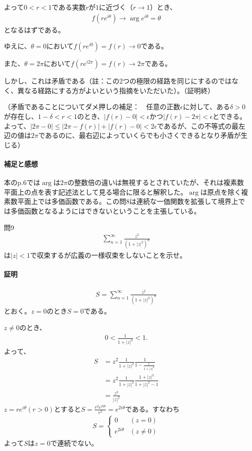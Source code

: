 よって$0<r<1$である実数$r$が$1$に近づく（$r\longrightarrow1$）とき、
\begin{align*}
    f(re^{i\theta})\longrightarrow \arg e^{i\theta}=\theta
\end{align*}
となるはずである。

ゆえに、$\theta=0$において$f(re^{i0})=f(r)\longrightarrow0$である。

また、$\theta=2\pi$において$f(re^{i2\pi})=f(r)\longrightarrow2\pi$である。

しかし、これは矛盾である（註：この2つの極限の経路を同じにするのではなく、異なる経路にする方がよいという指摘をいただいた）。（証明終）

（矛盾であることについてダメ押しの補足：　任意の正数$\epsilon$に対して、ある$\delta>0$が存在し、$1-\delta<r<1$のとき、$|f(r)-0|<\epsilon$かつ$|f(r)-2\pi|<\epsilon$とできる。
よって、$|2\pi-0|\le|2\pi-f(r)|+|f(r)-0|<2\epsilon$であるが、この不等式の最左辺の値は$2\pi$であるのに、最右辺によっていくらでも小さくできるとなり矛盾が生じる）

\paragraph{補足と感想}
本のp.6では$\arg$は$2\pi$の整数倍の違いは無視するとされていたが、それは複素数平面上の点を表す記述法として見る場合に限ると解釈した。$\arg$は原点を除く複素数平面上では多価函数である。この問8は連続な一価関数を拡張して境界上では多価函数となるようにはできないということを主張している。

\begin{mysimplebox}{問9}
    \begin{align*}
        \sum_{n=1}^{\infty}\frac{z^2}{(1+|z|^2)^n}
    \end{align*}
    は$|z|<1$で収束するが広義の一様収束をしないことを示せ。
\end{mysimplebox}
\paragraph{証明}
\begin{align*}
    S=\sum_{n=1}^{\infty}\frac{z^2}{(1+|z|^2)^n}
\end{align*}
とおく。$z=0$のとき$S=0$である。

$z\neq 0$のとき、
\begin{align*}
    0<\frac{1}{1+|z|^2}<1.
\end{align*}
よって、
\begin{align*}
    S&=z^2\frac{1}{1+|z|^2}\frac{1}{1-\frac{1}{1+|z|^2}}\\
    &=z^2\frac{1}{1+|z|^2}\frac{1+|z|^2}{1+|z|^2-1}\\
    &=\frac{z^2}{|z|^2}
\end{align*}
$z=re^{i\theta} (r>0)$とすると$S=\frac{r^2e^{2i\theta}}{r^2}=e^{2i\theta}$である。すなわち
\begin{align*}
    S=\left\{
        \begin{array}{cc}
            0 & (z=0)\\
            e^{2i\theta} & (z\neq 0)
        \end{array}
    \right.
\end{align*}
よって$S$は$z=0$で連続でない。

